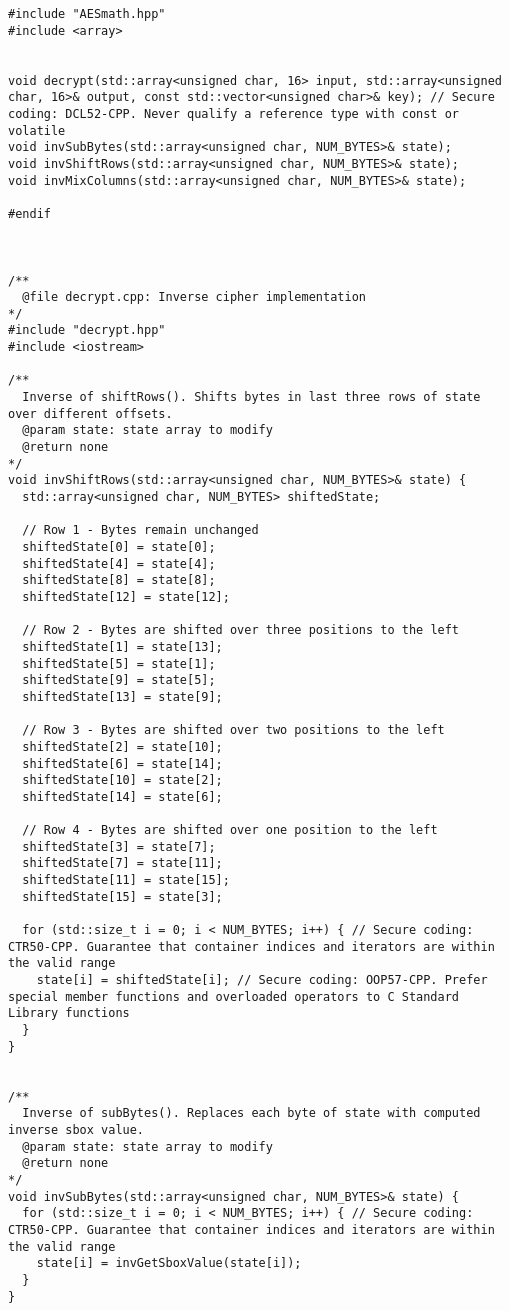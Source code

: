 \documentclass[a4paper,12pt]{article}
\begin{document}
{\begin{lstlisting}
#include "AESmath.hpp"
#include <array>


void decrypt(std::array<unsigned char, 16> input, std::array<unsigned char, 16>& output, const std::vector<unsigned char>& key); // Secure coding: DCL52-CPP. Never qualify a reference type with const or volatile
void invSubBytes(std::array<unsigned char, NUM_BYTES>& state);
void invShiftRows(std::array<unsigned char, NUM_BYTES>& state);
void invMixColumns(std::array<unsigned char, NUM_BYTES>& state);

#endif



/**
  @file decrypt.cpp: Inverse cipher implementation
*/
#include "decrypt.hpp"
#include <iostream>

/**
  Inverse of shiftRows(). Shifts bytes in last three rows of state over different offsets.
  @param state: state array to modify
  @return none
*/
void invShiftRows(std::array<unsigned char, NUM_BYTES>& state) {
  std::array<unsigned char, NUM_BYTES> shiftedState;

  // Row 1 - Bytes remain unchanged
  shiftedState[0] = state[0];
  shiftedState[4] = state[4];
  shiftedState[8] = state[8];
  shiftedState[12] = state[12];

  // Row 2 - Bytes are shifted over three positions to the left
  shiftedState[1] = state[13];
  shiftedState[5] = state[1];
  shiftedState[9] = state[5];
  shiftedState[13] = state[9];

  // Row 3 - Bytes are shifted over two positions to the left
  shiftedState[2] = state[10];
  shiftedState[6] = state[14];
  shiftedState[10] = state[2];
  shiftedState[14] = state[6];

  // Row 4 - Bytes are shifted over one position to the left
  shiftedState[3] = state[7];
  shiftedState[7] = state[11];
  shiftedState[11] = state[15];
  shiftedState[15] = state[3];

  for (std::size_t i = 0; i < NUM_BYTES; i++) { // Secure coding: CTR50-CPP. Guarantee that container indices and iterators are within the valid range
    state[i] = shiftedState[i]; // Secure coding: OOP57-CPP. Prefer special member functions and overloaded operators to C Standard Library functions
  }
}


/**
  Inverse of subBytes(). Replaces each byte of state with computed inverse sbox value.
  @param state: state array to modify
  @return none
*/
void invSubBytes(std::array<unsigned char, NUM_BYTES>& state) {
  for (std::size_t i = 0; i < NUM_BYTES; i++) { // Secure coding: CTR50-CPP. Guarantee that container indices and iterators are within the valid range
    state[i] = invGetSboxValue(state[i]);
  }
}



\end{lstlisting}}
\end{document}
